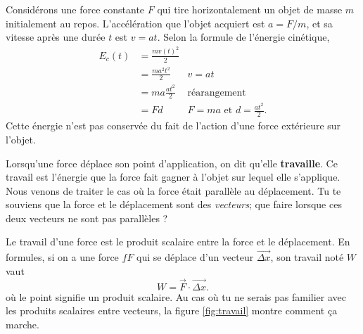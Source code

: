 \documentclass[a4paper,12pt]{book}
\theoremstyle{mes_exemples}	\newtheorem{exemple}[numtho]{Exemple}
\theoremstyle{mes_tho}
\newcommand{\defe}[2]{\textbf{#1}\index{#2}}
\begin{document}
Considérons une force constante $F$ qui tire horizontalement un objet de masse $m$ initialement au repos. L'accélération que l'objet acquiert est $a=F/m$, et sa vitesse après une durée $t$ est $v=at$. Selon la formule de l'énergie cinétique,
\begin{equation}
\begin{aligned}
   E_c(t)&=\frac{ mv(t)^2 }{ 2 }\\
	&=\frac{ ma^2t^2 }{ 2 }&\text{$v=at$}\\
	&=ma\frac{ at^2 }{ 2 }&\text{réarangement}\\
	&=Fd&\text{$F=ma$ et $d=\frac{ at^2 }{ 2 }$}.
\end{aligned}
\end{equation}
Cette énergie n'est pas conservée du fait de l'action d'une force extérieure sur l'objet.

Lorsqu'une force déplace son point d'application, on dit qu'elle \defe{travaille}{Travail}. Ce travail est l'énergie que la force fait gagner à l'objet sur lequel elle s'applique. Nous venons de traiter le cas où la force était parallèle au déplacement. Tu te souviens que la force et le déplacement sont des \emph{vecteurs}; que faire lorsque ces deux vecteurs ne sont pas parallèles ?

Le travail d'une force est le produit scalaire entre la force et le déplacement. En formules, si on a une force $fF$ qui se déplace d'un vecteur $\overrightarrow{\Delta x}$, son travail noté $W$ vaut
\[
W=   \overrightarrow{F}\cdot\overrightarrow{\Delta x}.
\]
où le point signifie un produit scalaire. Au cas où tu ne serais pas familier avec les produits scalaires entre vecteurs, la figure \ref{fig:travail} montre comment ça marche.
\end{document}
